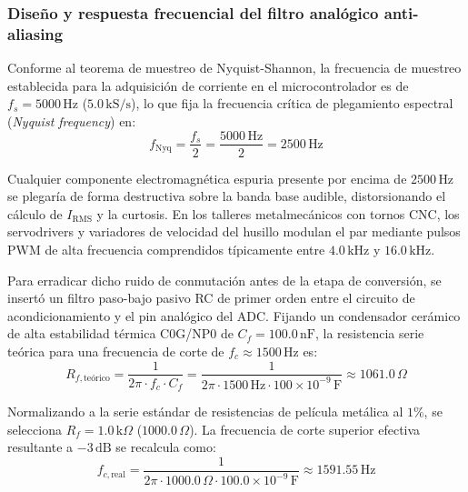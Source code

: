 \subsubsection{Diseño y respuesta frecuencial del filtro analógico anti-aliasing}
\label{subsubsec:diseno_filtro_antialiasing}

Conforme al teorema de muestreo de Nyquist-Shannon, la frecuencia de muestreo establecida para la adquisición de corriente en el microcontrolador es de $f_s = 5000\,\text{Hz}$ ($5.0\,\text{kS/s}$), lo que fija la frecuencia crítica de plegamiento espectral (\textit{Nyquist frequency}) en:
\begin{equation}
f_{\text{Nyq}} = \frac{f_s}{2} = \frac{5000\,\text{Hz}}{2} = 2500\,\text{Hz}
\label{eq:mp_frecuencia_nyquist}
\end{equation}

Cualquier componente electromagnética espuria presente por encima de $2500\,\text{Hz}$ se plegaría de forma destructiva sobre la banda base audible, distorsionando el cálculo de $I_{\text{RMS}}$ y la curtosis. En los talleres metalmecánicos con tornos CNC, los servodrivers y variadores de velocidad del husillo modulan el par mediante pulsos PWM de alta frecuencia comprendidos típicamente entre $4.0\,\text{kHz}$ y $16.0\,\text{kHz}$.

Para erradicar dicho ruido de conmutación antes de la etapa de conversión, se insertó un filtro paso-bajo pasivo RC de primer orden entre el circuito de acondicionamiento y el pin analógico del ADC. Fijando un condensador cerámico de alta estabilidad térmica C0G/NP0 de $C_f = 100.0\,\text{nF}$, la resistencia serie teórica para una frecuencia de corte de $f_c \approx 1500\,\text{Hz}$ es:
\begin{equation}
R_{f,\text{teórico}} = \frac{1}{2\pi \cdot f_c \cdot C_f} = \frac{1}{2\pi \cdot 1500\,\text{Hz} \cdot 100 \times 10^{-9}\,\text{F}} \approx 1061.0\,\Omega
\label{eq:mp_calculo_rf}
\end{equation}

Normalizando a la serie estándar de resistencias de película metálica al $1\%$, se selecciona $R_f = 1.0\,\text{k}\Omega$ ($1000.0\,\Omega$). La frecuencia de corte superior efectiva resultante a $-3\,\text{dB}$ se recalcula como:
\begin{equation}
f_{c,\text{real}} = \frac{1}{2\pi \cdot 1000.0\,\Omega \cdot 100.0 \times 10^{-9}\,\text{F}} \approx 1591.55\,\text{Hz}
\label{eq:mp_fc_real}
\end{equation}

